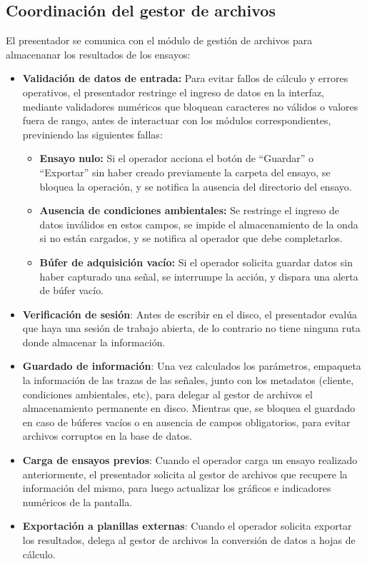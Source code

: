 \subsection{Coordinación del gestor de archivos}
\label{subsec:coordinacion_archivos}

El presentador se comunica con el módulo de gestión de archivos para almacenanar los resultados de los ensayos:
\begin{itemize}
        \item \textbf{Validación de datos de entrada:} Para evitar fallos de cálculo y errores operativos, el presentador restringe el ingreso de datos en la interfaz, mediante validadores numéricos que bloquean caracteres no válidos o valores fuera de rango, antes de interactuar con los módulos correspondientes, previniendo las siguientes fallas:
        \begin{itemize}
            \item \textbf{Ensayo nulo:} Si el operador acciona el botón de \enquote{Guardar} o \enquote{Exportar} sin haber creado previamente la carpeta del ensayo, se bloquea la operación, y se notifica la ausencia del directorio del ensayo.
            \item \textbf{Ausencia de condiciones ambientales:} Se restringe el ingreso de datos inválidos en estos campos, se impide el almacenamiento de la onda si no están cargados, y se notifica al operador que debe completarlos.
            \item \textbf{Búfer de adquisición vacío:} Si el operador solicita guardar datos sin haber capturado una señal, se interrumpe la acción, y dispara una alerta de búfer vacío.
        \end{itemize}
    \item \textbf{Verificación de sesión}: Antes de escribir en el disco, el presentador evalúa que haya una sesión de trabajo abierta, de lo contrario no tiene ninguna ruta donde almacenar la información.
    \item \textbf{Guardado de información}: Una vez calculados los parámetros, empaqueta la información de las trazas de las señales, junto con los metadatos (cliente, condiciones ambientales, etc), para delegar al gestor de archivos el almacenamiento permanente en disco. Mientras que, se bloquea el guardado en caso de búferes vacíos o en ausencia de campos obligatorios, para evitar archivos corruptos en la base de datos.
    \item \textbf{Carga de ensayos previos}: Cuando el operador carga un ensayo realizado anteriormente, el presentador solicita al gestor de archivos que recupere la información del mismo, para luego actualizar los gráficos e indicadores numéricos de la pantalla.
    \item \textbf{Exportación a planillas externas}: Cuando el operador solicita exportar los resultados, delega al gestor de archivos la conversión de datos a hojas de cálculo.
\end{itemize}


